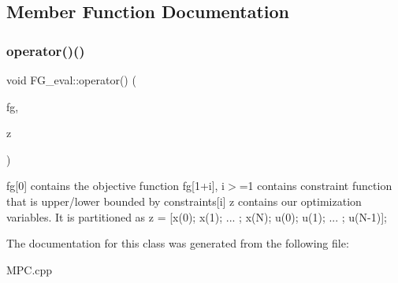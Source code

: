 \subsection{Member Function Documentation}
\mbox{\label{classFG__eval_a43a1e90f9d5b9729c3c3f2d4b83c2abe}} 
\subsubsection{\texorpdfstring{operator()()}{operator()()}}
{\footnotesize\ttfamily void F\+G\+\_\+eval\+::operator() (\begin{DoxyParamCaption}\item[{A\+Dvector \&}]{fg,  }\item[{const A\+Dvector \&}]{z }\end{DoxyParamCaption})\hspace{0.3cm}{\ttfamily [inline]}}

fg\mbox{[}0\mbox{]} contains the objective function fg\mbox{[}1+i\mbox{]}, i$>$=1 contains constraint function that is upper/lower bounded by constraints\mbox{[}i\mbox{]} z contains our optimization variables. It is partitioned as z = \mbox{[}x(0); x(1); ... ; x(\+N); u(0); u(1); ... ; u(N-\/1)\mbox{]}; 

The documentation for this class was generated from the following file\+:\begin{DoxyCompactItemize}
\item 
M\+P\+C.\+cpp\end{DoxyCompactItemize}
